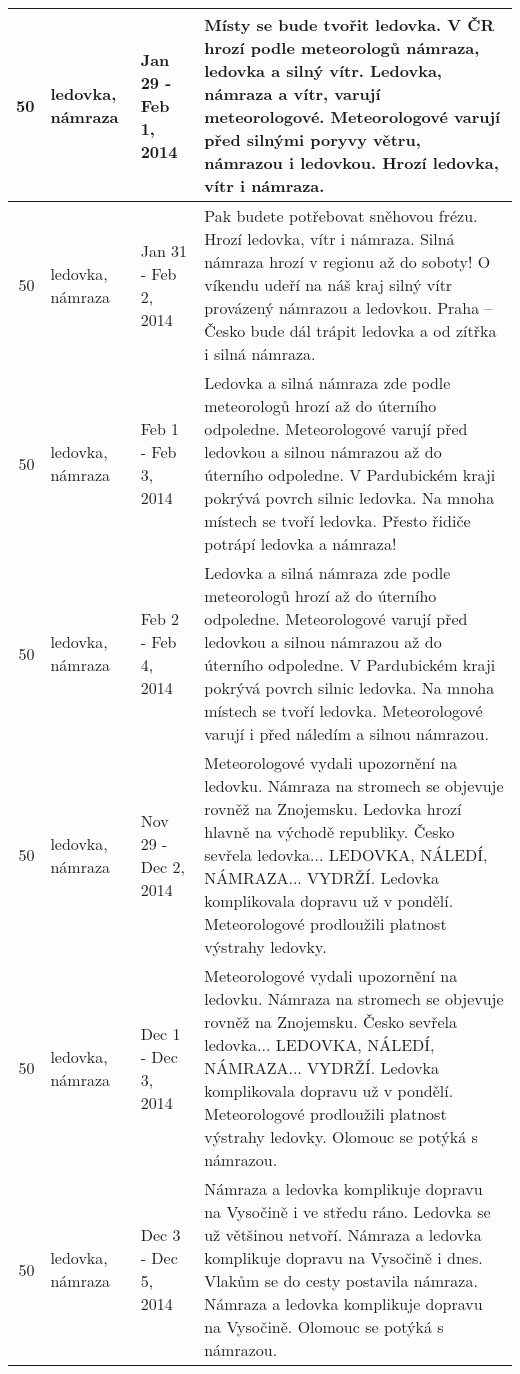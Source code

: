 \begin{tabularx}{\linewidth}{r m{2.5cm} X m{8cm}}
50 & ledovka, námraza & Jan 29 - Feb 1, 2014 & Místy se bude tvořit ledovka. V ČR hrozí podle meteorologů námraza, ledovka a silný vítr. Ledovka, námraza a vítr, varují meteorologové. Meteorologové varují před silnými poryvy větru, námrazou i ledovkou. Hrozí ledovka, vítr i námraza. \\ \midrule
50 & ledovka, námraza & Jan 31 - Feb 2, 2014 & Pak budete potřebovat sněhovou frézu. Hrozí ledovka, vítr i námraza. Silná námraza hrozí v regionu až do soboty! O víkendu udeří na náš kraj silný vítr provázený námrazou a ledovkou. Praha – Česko bude dál trápit ledovka a od zítřka i silná námraza. \\ \midrule
50 & ledovka, námraza & Feb 1 - Feb 3, 2014 & Ledovka a silná námraza zde podle meteorologů hrozí až do úterního odpoledne. Meteorologové varují před ledovkou a silnou námrazou až do úterního odpoledne. V Pardubickém kraji pokrývá povrch silnic ledovka. Na mnoha místech se tvoří ledovka. Přesto řidiče potrápí ledovka a námraza! \\ \midrule
50 & ledovka, námraza & Feb 2 - Feb 4, 2014 & Ledovka a silná námraza zde podle meteorologů hrozí až do úterního odpoledne. Meteorologové varují před ledovkou a silnou námrazou až do úterního odpoledne. V Pardubickém kraji pokrývá povrch silnic ledovka. Na mnoha místech se tvoří ledovka. Meteorologové varují i před náledím a silnou námrazou. \\ \midrule
50 & ledovka, námraza & Nov 29 - Dec 2, 2014 & Meteorologové vydali upozornění na ledovku. Námraza na stromech se objevuje rovněž na Znojemsku. Ledovka hrozí hlavně na východě republiky. Česko sevřela ledovka... LEDOVKA, NÁLEDÍ, NÁMRAZA... VYDRŽÍ. Ledovka komplikovala dopravu už v pondělí. Meteorologové prodloužili platnost výstrahy ledovky. \\ \midrule
50 & ledovka, námraza & Dec 1 - Dec 3, 2014 & Meteorologové vydali upozornění na ledovku. Námraza na stromech se objevuje rovněž na Znojemsku. Česko sevřela ledovka... LEDOVKA, NÁLEDÍ, NÁMRAZA... VYDRŽÍ. Ledovka komplikovala dopravu už v pondělí. Meteorologové prodloužili platnost výstrahy ledovky. Olomouc se potýká s námrazou. \\ \midrule
50 & ledovka, námraza & Dec 3 - Dec 5, 2014 & Námraza a ledovka komplikuje dopravu na Vysočině i ve středu ráno. Ledovka se už většinou netvoří. Námraza a ledovka komplikuje dopravu na Vysočině i dnes. Vlakům se do cesty postavila námraza. Námraza a ledovka komplikuje dopravu na Vysočině. Olomouc se potýká s námrazou. \\ \midrule

\end{tabularx}
